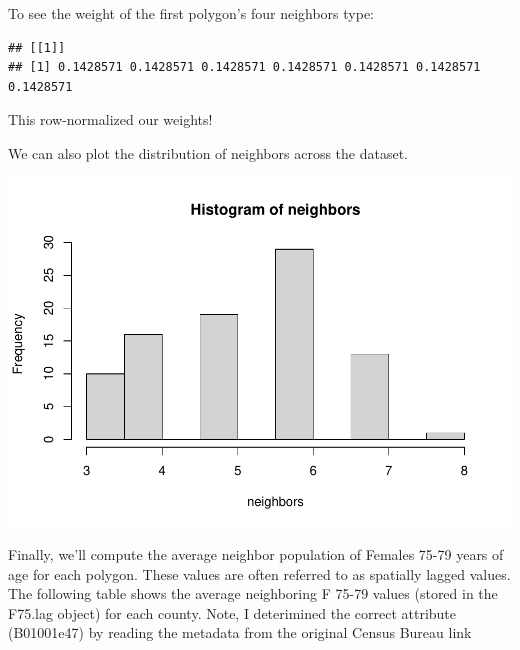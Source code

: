 \documentclass[]{article}
\newenvironment{Shaded}{\begin{snugshade}}{\end{snugshade}}
\newcommand{\CommentTok}[1]{\textcolor[rgb]{0.56,0.35,0.01}{\textit{#1}}}
\newcommand{\DecValTok}[1]{\textcolor[rgb]{0.00,0.00,0.81}{#1}}
\newcommand{\FunctionTok}[1]{\textcolor[rgb]{0.13,0.29,0.53}{\textbf{#1}}}
\newcommand{\NormalTok}[1]{#1}
\newcommand{\OtherTok}[1]{\textcolor[rgb]{0.56,0.35,0.01}{#1}}
\newcommand{\SpecialCharTok}[1]{\textcolor[rgb]{0.81,0.36,0.00}{\textbf{#1}}}
\newcommand{\StringTok}[1]{\textcolor[rgb]{0.31,0.60,0.02}{#1}}
\begin{document}
To see the weight of the first polygon's four neighbors type:

\begin{Shaded}
\end{Shaded}

\begin{verbatim}
## [[1]]
## [1] 0.1428571 0.1428571 0.1428571 0.1428571 0.1428571 0.1428571 0.1428571
\end{verbatim}

This row-normalized our weights!

We can also plot the distribution of neighbors across the dataset.

\begin{Shaded}
\end{Shaded}

\includegraphics{lab03_files/figure-latex/plotneighbors-1.pdf}

Finally, we'll compute the average neighbor population of Females 75-79
years of age for each polygon. These values are often referred to as
spatially lagged values. The following table shows the average
neighboring F 75-79 values (stored in the F75.lag object) for each
county. Note, I deterimined the correct attribute (B01001e47) by reading
the metadata from the original Census Bureau link
\end{document}
